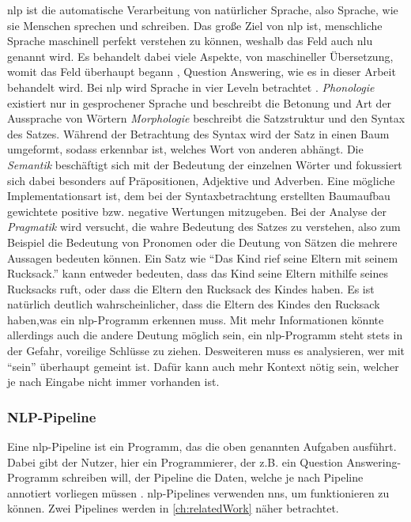 \acf{nlp} ist die automatische Verarbeitung von natürlicher Sprache, also Sprache, wie sie Menschen sprechen und schreiben.
Das große Ziel von \ac{nlp} ist, menschliche Sprache maschinell perfekt verstehen zu können, weshalb das Feld auch \ac{nlu} genannt wird.
Es behandelt dabei viele Aspekte, von maschineller Übersetzung, womit das Feld überhaupt begann \citep{nlphistory}, Question Answering, wie es in dieser Arbeit behandelt wird.
Bei \ac{nlp} wird Sprache in vier Leveln betrachtet \citep{nlpreviewtts}.
\emph{Phonologie} existiert nur in gesprochener Sprache und beschreibt die Betonung und Art der Aussprache von Wörtern
\emph{Morphologie} beschreibt die Satzstruktur und den Syntax des Satzes.
Während der Betrachtung des Syntax wird der Satz in einen Baum umgeformt, sodass erkennbar ist, welches Wort von anderen abhängt.
Die \emph{Semantik} beschäftigt sich mit der Bedeutung der einzelnen Wörter und fokussiert sich dabei besonders auf Präpositionen, Adjektive und Adverben.
Eine mögliche Implementationsart ist, dem bei der Syntaxbetrachtung erstellten Baumaufbau gewichtete positive bzw. negative Wertungen mitzugeben.
Bei der Analyse der \emph{Pragmatik} wird versucht, die wahre Bedeutung des Satzes zu verstehen, also zum Beispiel die Bedeutung von Pronomen oder die Deutung von Sätzen die mehrere Aussagen bedeuten können.
Ein Satz wie \enquote{Das Kind rief seine Eltern mit seinem Rucksack.} kann entweder bedeuten, dass das Kind seine Eltern mithilfe seines Rucksacks ruft, oder dass die Eltern den Rucksack des Kindes haben.
Es ist natürlich deutlich wahrscheinlicher, dass die Eltern des Kindes den Rucksack haben,was ein \ac{nlp}-Programm erkennen muss.
Mit mehr Informationen könnte allerdings auch die andere Deutung möglich sein, ein \ac{nlp}-Programm steht stets in der Gefahr, voreilige Schlüsse zu ziehen.
Desweiteren muss es analysieren, wer mit \enquote{sein} überhaupt gemeint ist.
Dafür kann auch mehr Kontext nötig sein, welcher je nach Eingabe nicht immer vorhanden ist.

\subsubsection{NLP-Pipeline}

Eine \ac{nlp}-Pipeline ist ein Programm, das die oben genannten Aufgaben ausführt.
Dabei gibt der Nutzer, hier ein Programmierer, der z.B. ein Question Answering-Programm schreiben will, der Pipeline die Daten, welche je nach Pipeline annotiert vorliegen müssen \citep{curatorpipeline}.
\ac{nlp}-Pipelines verwenden \acp{nn}, um funktionieren zu können.
Zwei Pipelines werden in \cref{ch:relatedWork} näher betrachtet.
